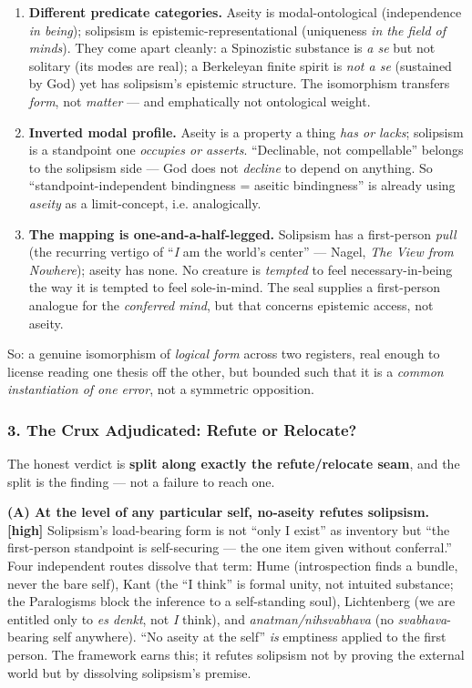 \documentclass[11pt]{article}
\begin{document}
\begin{enumerate}
\item \textbf{Different predicate categories.} Aseity is modal-ontological (independence \emph{in being}); solipsism is epistemic-representational (uniqueness \emph{in the field of minds}). They come apart cleanly: a Spinozistic substance is \emph{a se} but not solitary (its modes are real); a Berkeleyan finite spirit is \emph{not a se} (sustained by God) yet has solipsism's epistemic structure. The isomorphism transfers \emph{form}, not \emph{matter} — and emphatically not ontological weight.
\item \textbf{Inverted modal profile.} Aseity is a property a thing \emph{has or lacks}; solipsism is a standpoint one \emph{occupies or asserts}. ``Declinable, not compellable'' belongs to the solipsism side — God does not \emph{decline} to depend on anything. So ``standpoint-independent bindingness = aseitic bindingness'' is already using \emph{aseity} as a limit-concept, i.e. analogically.
\item \textbf{The mapping is one-and-a-half-legged.} Solipsism has a first-person \emph{pull} (the recurring vertigo of ``\emph{I} am the world's center'' — Nagel, \emph{The View from Nowhere}); aseity has none. No creature is \emph{tempted} to feel necessary-in-being the way it is tempted to feel sole-in-mind. The seal supplies a first-person analogue for the \emph{conferred mind}, but that concerns epistemic access, not aseity.
\end{enumerate}

So: a genuine isomorphism of \emph{logical form} across two registers, real enough to license reading one thesis off the other, but bounded such that it is a \emph{common instantiation of one error}, not a symmetric opposition.

\subsubsection*{3. The Crux Adjudicated: Refute or Relocate?}

The honest verdict is \textbf{split along exactly the refute/\allowbreak{}relocate seam}, and the split is the finding — not a failure to reach one.

\textbf{(A) At the level of any particular self, no-aseity refutes solipsism. [high]} Solipsism's load-bearing form is not ``only I exist'' as inventory but ``the first-person standpoint is self-securing — the one item given without conferral.'' Four independent routes dissolve that term: Hume (introspection finds a bundle, never the bare self), Kant (the ``I think'' is formal unity, not intuited substance; the Paralogisms block the inference to a self-standing soul), Lichtenberg (we are entitled only to \emph{es denkt}, not \emph{I} think), and \emph{anatman/\allowbreak{}nihsvabhava} (no \emph{svabhava}-bearing self anywhere). ``No aseity at the self'' \emph{is} emptiness applied to the first person. The framework earns this; it refutes solipsism not by proving the external world but by dissolving solipsism's premise.
\end{document}
